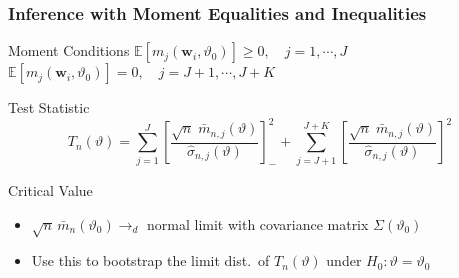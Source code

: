 \documentclass[handout]{beamer}
\begin{document}
\begin{frame}
  \frametitle{Inference with Moment Equalities and Inequalities}
  \small

\begin{block}{Moment Conditions}
  $\mathbb{E} \left[ m_j(\mathbf{w}_i,\vartheta_0) \right] \geq 0, \quad j = 1, \cdots, J$\\
  $\mathbb{E} \left[ m_j(\mathbf{w}_i,\vartheta_0) \right]  = 0, \quad j = J+1, \cdots, J + K$
\end{block}


\begin{block}{Test Statistic}
  \vspace{-1em}
\[
  T_n(\vartheta) = \sum_{j=1}^J \left[\frac{\sqrt{n}\; \bar{m}_{n,j}(\vartheta)}{\widehat{\sigma}_{n,j}(\vartheta)}\right]^2_- + \sum_{j=J+1}^{J+K} \left[\frac{\sqrt{n}\; \bar{m}_{n,j}(\vartheta)}{\widehat{\sigma}_{n,j}(\vartheta)}\right]^2
\]
\scriptsize
\end{block}

  \begin{block}{Critical Value} 
    \begin{itemize}
      \item $\sqrt{n}\, \bar{m}_n(\vartheta_0) \rightarrow_d$ normal limit with covariance matrix $\Sigma(\vartheta_0)$
    \item Use this to bootstrap the limit dist.\ of  $T_n(\vartheta)$ under $H_0\colon \vartheta = \vartheta_0$
    \end{itemize}
  \end{block}
  

\end{frame}
\end{document}
